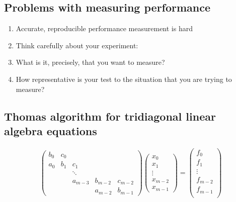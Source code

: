 \documentclass[%
oneside,                 %
final,                   %
10pt]{article}
\begin{document}
\noindent
\subsection*{Problems with measuring performance}
\begin{enumerate}
\item Accurate, reproducible performance measurement is hard

\item Think carefully about your experiment:

\item What is it, precisely, that you want to measure?

\item How representative is your test to the situation that you are trying to measure?
\end{enumerate}

\noindent
\subsection*{Thomas algorithm for tridiagonal linear algebra equations}

\paragraph{}
\[
\left( \begin{array}{ccccc}
        b_0 & c_0 &        &         &         \\
	a_0 &  b_1 &  c_1    &         &         \\
	   &    & \ddots  &         &         \\
	      &	    & a_{m-3} & b_{m-2} & c_{m-2} \\
	         &    &         & a_{m-2} & b_{m-1}
   \end{array} \right)
\left( \begin{array}{c}
       x_0     \\
       x_1     \\
       \vdots  \\
       x_{m-2} \\
       x_{m-1}
   \end{array} \right)=\left( \begin{array}{c}
       f_0     \\
       f_1     \\
       \vdots  \\
       f_{m-2} \\
       f_{m-1} \\
   \end{array} \right)
\]
\end{document}
